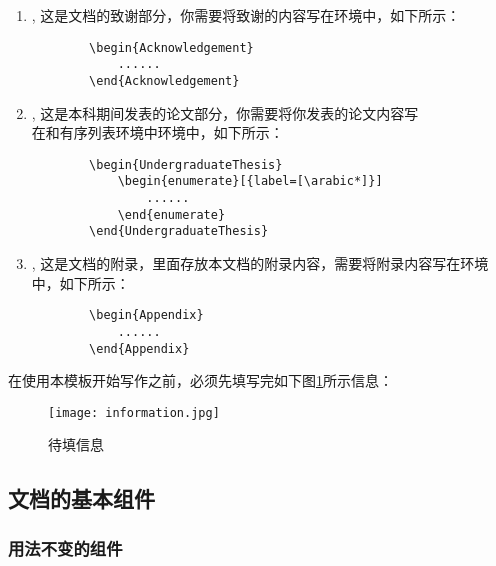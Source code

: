 \documentclass{nitthesis}
\begin{document}
\begin{enumerate}
    \item {}, 这是文档的致谢部分，你需要将致谢的内容写在环境中，如下所示：
    \label{sec.1.1.1}
    \begin{lstlisting}
        \begin{Acknowledgement}
            ......
        \end{Acknowledgement}
    \end{lstlisting}

    \item {}, 这是本科期间发表的论文部分，你需要将你发表的论文内容写\\在和有序列表环境中环境中，如下所示：
    \begin{lstlisting}
        \begin{UndergraduateThesis}
            \begin{enumerate}[{label=[\arabic*]}]
                ......
            \end{enumerate}
        \end{UndergraduateThesis}
    \end{lstlisting}


    \item {}, 这是文档的附录，里面存放本文档的附录内容，需要将附录内容写在环境中，如下所示：
    \begin{lstlisting}
        \begin{Appendix}
            ......
        \end{Appendix}
    \end{lstlisting}


\end{enumerate}

在使用本模板开始写作之前，必须先填写完如下图\ref{fig.Information}所示信息：

\begin{figure}[H]
    \centering
    \texttt{[image: information.jpg]}
    \caption{待填信息}
    \label{fig.Information}
\end{figure}

\subsection{文档的基本组件}

\subsubsection{用法不变的组件}
\end{document}
